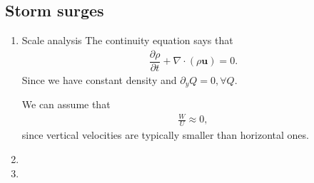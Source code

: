 \documentclass{article}
\begin{document}
        \subsection{Storm surges}

            \begin{enumerate}[label=\alph*)]
                \item Scale analysis
                    The continuity equation says that
                    \begin{align*}
                        \dfrac{\partial \rho}{\partial t} + \nabla \cdot (\rho \mathbf{u}) = 0.
                    \end{align*}
                    Since we have constant density and $\partial_yQ = 0, \forall Q$.

                    We can assume that
                    \begin{align*}
                        \frac{W}{U} \approx 0,
                    \end{align*}
                    since vertical velocities are typically smaller than horizontal ones.
                \item 
                \item 
            \end{enumerate}
\end{document}
